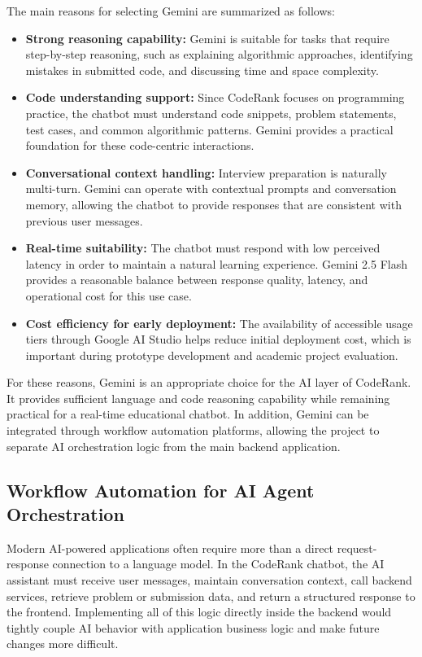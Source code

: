 The main reasons for selecting Gemini are summarized as follows:
\begin{itemize}
    \item \textbf{Strong reasoning capability:} Gemini is suitable for tasks that require step-by-step reasoning, such as explaining algorithmic approaches, identifying mistakes in submitted code, and discussing time and space complexity.
    
    \item \textbf{Code understanding support:} Since CodeRank focuses on programming practice, the chatbot must understand code snippets, problem statements, test cases, and common algorithmic patterns. Gemini provides a practical foundation for these code-centric interactions.
    
    \item \textbf{Conversational context handling:} Interview preparation is naturally multi-turn. Gemini can operate with contextual prompts and conversation memory, allowing the chatbot to provide responses that are consistent with previous user messages.
    
    \item \textbf{Real-time suitability:} The chatbot must respond with low perceived latency in order to maintain a natural learning experience. Gemini 2.5 Flash provides a reasonable balance between response quality, latency, and operational cost for this use case.
    
    \item \textbf{Cost efficiency for early deployment:} The availability of accessible usage tiers through Google AI Studio helps reduce initial deployment cost, which is important during prototype development and academic project evaluation.
\end{itemize}

For these reasons, Gemini is an appropriate choice for the AI layer of CodeRank. It provides sufficient language and code reasoning capability while remaining practical for a real-time educational chatbot. In addition, Gemini can be integrated through workflow automation platforms, allowing the project to separate AI orchestration logic from the main backend application.

\subsection{Workflow Automation for AI Agent Orchestration}

Modern AI-powered applications often require more than a direct request-response connection to a language model. In the CodeRank chatbot, the AI assistant must receive user messages, maintain conversation context, call backend services, retrieve problem or submission data, and return a structured response to the frontend. Implementing all of this logic directly inside the backend would tightly couple AI behavior with application business logic and make future changes more difficult.

